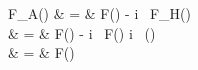 F_A(\xi) & = & F(\xi) - i \, F_H(\xi) \nonumber \\
& = & F(\xi) - i \, F(\xi) \cdot i \, \sgn (\xi) \nonumber \\
& = & F(\xi) \cdot [ 1 + \sgn (\xi) ]
